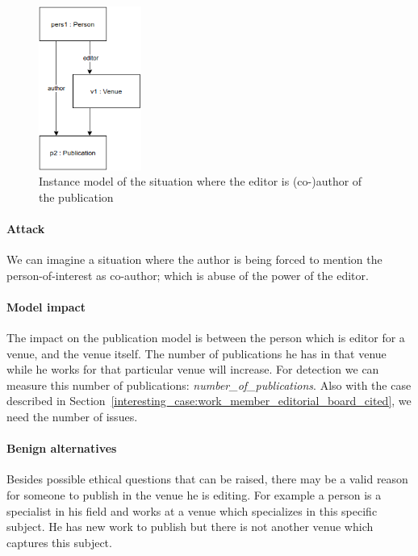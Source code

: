 \documentclass{ou-report}
\begin{document}
\begin{figure}
    \centering
    \includegraphics[width=0.3\textwidth]{images/editor_is_author.drawio.png}
    \caption{Instance model of the situation where the editor is \mbox{(co-)author} of the publication}
    \label{fig:eia}
\end{figure}



\paragraph{Attack}
We can imagine a situation where the author is being forced to mention the 
person-of-interest as co-author; which is abuse of the power of the editor.

\paragraph{Model impact}
The impact on the publication model is between the person which is 
\mbox{editor} for a 
venue, and the venue itself. 
The number of publications he has in that venue while he works for that 
particular venue 
will increase. For detection we can measure this number of publications:
\textit{number\_of\_publications}. Also with the 
case described in 
Section~\ref{interesting_case:work_member_editorial_board_cited}, we need the 
number of issues.

\paragraph{Benign alternatives}
Besides possible ethical questions that can be raised, there may be a valid
reason for someone to publish in the venue he is editing. For example a person
is a 
specialist in his field and works at a venue which specializes in this 
specific subject. He has new work to publish but there is not another venue 
which captures this subject.
\end{document}
